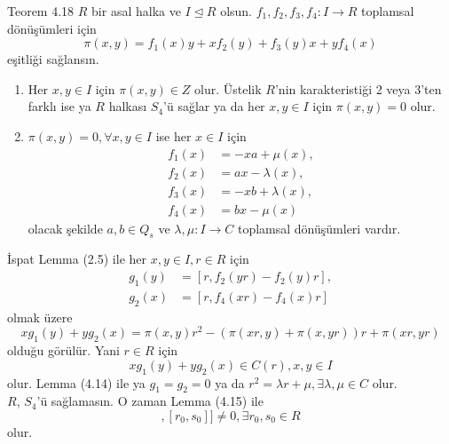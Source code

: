 \documentclass{beamer}
\begin{document}
\begin{frame}
\footnotesize

\begin{block}{Teorem 4.18}
$R$ bir asal halka ve $I \trianglelefteq R$ olsun. $f_1, f_2, f_3, f_4 \colon I \to R$ toplamsal dönüşümleri için
\begin{equation*}
    \pi(x,y) =  f_1(x)y + xf_2(y) + f_3(y)x + yf_4(x)
\end{equation*}
eşitliği sağlansın.
\begin{enumerate}
    \item Her $x, y \in I$ için $\pi(x,y) \in Z$ olur. Üstelik $R$'nin karakteristiği 2 veya 3'ten farklı ise ya $R$ halkası $S_4$'ü sağlar ya da her $x, y \in I$ için $\pi(x,y) = 0$ olur.
    \item $\pi(x,y) = 0, \forall x, y \in I$ ise her $x \in I$ için
    \begin{align*}
        f_1(x) &= -xa + \mu(x),\\
        f_2(x) &= ax - \lambda(x),\\
        f_3(x) &= -xb + \lambda(x),\\
        f_4(x) &= bx - \mu(x)
    \end{align*}
    olacak şekilde $a, b \in Q_s$ ve $\lambda, \mu \colon I \to C$ toplamsal dönüşümleri vardır.
\end{enumerate}
\end{block}

\end{frame}

\begin{frame}
\footnotesize

\begin{block}{İspat}
Lemma (2.5) ile her $x, y \in I, r \in R$ için
\begin{align*}
    g_1(y) &= [r, f_2(yr)-f_2(y)r],\\
    g_2(x) &= [r, f_4(xr)-f_4(x)r]
\end{align*}
olmak üzere
\begin{equation*}
    xg_1(y)+yg_2(x) = \pi(x,y)r^2-(\pi(xr,y)+\pi(x,yr))r+\pi(xr,yr)
\end{equation*}
olduğu görülür. Yani $r \in R$ için
\begin{equation*}
    xg_1(y) + yg_2(x) \in C(r), x, y \in I
\end{equation*}
olur. Lemma (4.14) ile ya $g_1 = g_2 = 0$ ya da $r^2 = \lambda r + \mu, \exists \lambda, \mu \in C$ olur.\\
$R$, $S_4$'ü sağlamasın. O zaman Lemma (4.15) ile
\begin{equation*}
    [[r_0^2,s_0],[r_0,s_0]] \neq 0, \exists r_0, s_0 \in R
\end{equation*}
olur.
\end{block}
    
\end{frame}
\end{document}
